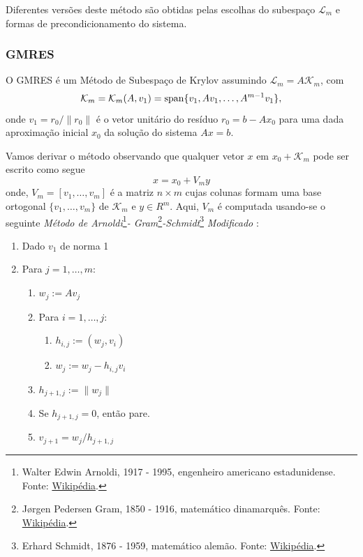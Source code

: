 Diferentes versões deste método são obtidas pelas escolhas do subespaço $\mathcal{L}_m$ e formas de precondicionamento do sistema.

\subsubsection{GMRES}

O GMRES é um Método de Subespaço de Krylov assumindo $\mathcal{L}_m = A\mathcal{K}_m$, com
\begin{equation}
  \mathcal{K}_m = \mathcal{K}_m(A,v_1) = \operatorname{span}\{v_1, Av_1, \dotsc, A^{m-1}v_1\},
\end{equation}
onde $v_1 = r_0/\|r_0\|$ é o vetor unitário do resíduo $r_0 = b - Ax_0$ para uma dada aproximação inicial $x_0$ da solução do sistema $Ax = b$.

Vamos derivar o método observando que qualquer vetor $x$ em $x_0 + \mathcal{K}_m$ pode ser escrito como segue
\begin{equation}
  x = x_0 + V_my
\end{equation}
onde, $V_m = [v_1,\dotsc,v_m]$ é a matriz $n\times m$ cujas colunas formam uma base ortogonal $\{v_1, \dotsc, v_m\}$ de $\mathcal{K}_m$ e $y\in R^m$. Aqui, $V_m$ é computada usando-se o seguinte \emph{Método de Arnoldi}\footnote{Walter Edwin Arnoldi, 1917 - 1995, engenheiro americano estadunidense. Fonte: \href{https://pt.wikipedia.org/wiki/Walter_Edwin_Arnoldi}{Wikipédia}.}\emph{- Gram}\footnote{Jørgen Pedersen Gram, 1850 - 1916, matemático dinamarquês. Fonte: \href{https://pt.wikipedia.org/wiki/J\%C3\%B8rgen_Pedersen_Gram}{Wikipédia}.}\emph{-Schmidt}\footnote{Erhard Schmidt, 1876 - 1959, matemático alemão. Fonte: \href{https://pt.wikipedia.org/wiki/Erhard_Schmidt}{Wikipédia}.} \emph{Modificado} \cite[Subseção 6.3]{Saad2003}:
\begin{enumerate}[1.]
\item Dado $v_1$ de norma 1
\item Para $j=1,\dotsc,m$:
  \begin{enumerate}
  \item $w_j := Av_j$
  \item Para $i=1,\dotsc,j$:
    \begin{enumerate}
    \item $h_{i,j} := (w_j,v_i)$
    \item $w_j := w_j - h_{i,j}v_i$
    \end{enumerate}
  \item $h_{j+1,j} := \|w_j\|$
  \item Se $h_{j+1,j}=0$, então pare.
  \item $v_{j+1} = w_j/h_{j+1,j}$
\end{enumerate}
\end{enumerate}

